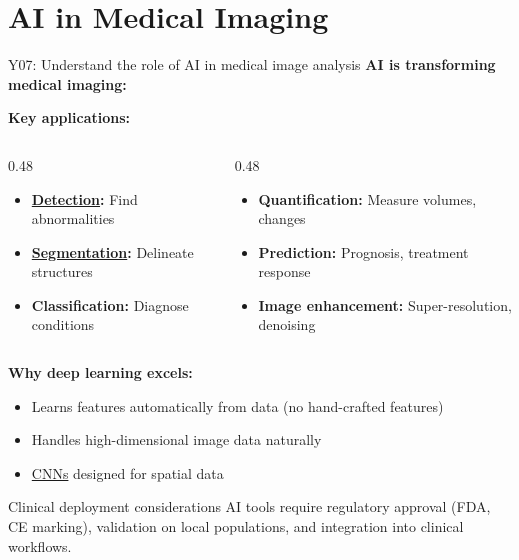 \documentclass[aspectratio=169, 10pt]{beamer}
\begin{document}
\section{AI in Medical Imaging}

\begin{frame}{Y07: Understand the role of AI in medical image analysis}
    \textbf{AI is transforming medical imaging:}
    
    \vspace{0.2cm}
    \textbf{Key applications:}
    \begin{columns}[T]
        \begin{column}{0.48\textwidth}
            \begin{itemize}
                \item \textbf{\href{https://en.wikipedia.org/wiki/Computer-aided_detection}{Detection}:} Find abnormalities
                \item \textbf{\href{https://en.wikipedia.org/wiki/Image_segmentation}{Segmentation}:} Delineate structures
                \item \textbf{Classification:} Diagnose conditions
            \end{itemize}
        \end{column}
        \begin{column}{0.48\textwidth}
            \begin{itemize}
                \item \textbf{Quantification:} Measure volumes, changes
                \item \textbf{Prediction:} Prognosis, treatment response
                \item \textbf{Image enhancement:} Super-resolution, denoising
            \end{itemize}
        \end{column}
    \end{columns}
    
    \vspace{0.2cm}
    \textbf{Why deep learning excels:}
    \begin{itemize}
        \item Learns features automatically from data (no hand-crafted features)
        \item Handles high-dimensional image data naturally
        \item \href{https://en.wikipedia.org/wiki/Convolutional_neural_network}{CNNs} designed for spatial data
    \end{itemize}
    
    {\small
    \begin{alertblock}{Clinical deployment considerations}
        AI tools require regulatory approval (FDA, CE marking), validation on local populations, and integration into clinical workflows.
    \end{alertblock}
    }
\end{frame}
\end{document}
